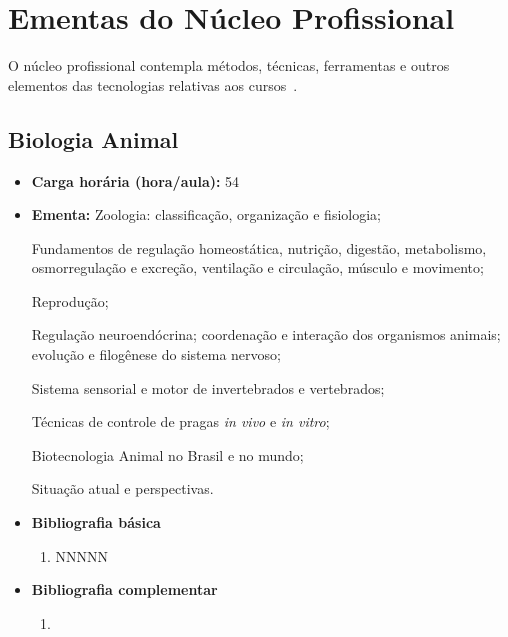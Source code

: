 \documentclass[11pt,fleqn]{book} %
\begin{document}
\newpage
\section{Ementas do Núcleo Profissional}\label{ementasTecnico}
\indent

O núcleo profissional contempla métodos, técnicas, ferramentas e outros elementos das tecnologias relativas aos cursos~\cite{Resolucao06De2012}.

\newpage
\subsection{Biologia Animal}\label{disc:biotecAnimal}
\begin{itemize}
	\item \textbf{Carga horária (hora/aula):} 54
	\item \textbf{Ementa:}	
	Zoologia: classificação, organização e fisiologia;
	
	Fundamentos de regulação homeostática, nutrição, digestão, metabolismo, osmorregulação e excreção, ventilação e circulação, músculo e movimento;
	
	Reprodução; 

	Regulação neuroendócrina; coordenação e interação dos organismos animais; evolução e filogênese do sistema nervoso; 
	
	Sistema sensorial e motor de invertebrados e vertebrados;	
	
	Técnicas de controle de pragas \textit{in vivo} e \textit{in vitro};
	
	Biotecnologia Animal no Brasil e no mundo; 
	
	Situação atual e perspectivas.
	\item \textbf{Bibliografia básica}
	\begin{enumerate}
		\item NNNNN
	\end{enumerate}
	\item \textbf{Bibliografia complementar}
	\begin{enumerate}
		\item 
	\end{enumerate}	
\end{itemize}

\newpage
\end{document}
